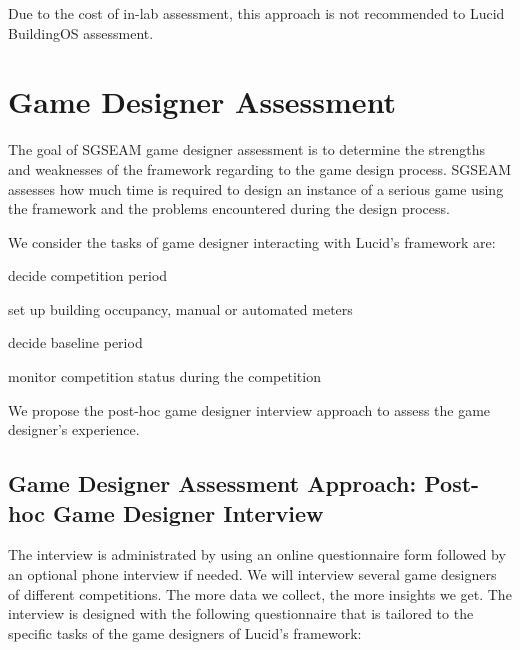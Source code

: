 \documentclass[11pt,oneside]{book}
\begin{document}
Due to the cost of in-lab assessment, this approach is not recommended to Lucid BuildingOS assessment.

\section{Game Designer Assessment}

The goal of SGSEAM game designer assessment is to determine the strengths and weaknesses of the framework 
regarding to the game design process. SGSEAM 
assesses how much time is required to design an instance of a serious game using the framework and the problems encountered during the design process.

We consider the tasks of game designer interacting with Lucid's framework are:
\begin{compactenum}
    \item decide competition period
    \item set up building occupancy, manual or automated meters
    \item decide baseline period
    \item monitor competition status during the competition
\end{compactenum}

We propose the post-hoc game designer interview approach to assess the game designer's experience.

\subsection{Game Designer Assessment Approach: Post-hoc Game Designer Interview}
\label{Post-hoc game designer interview}

 The interview is administrated by using an online questionnaire form followed by an optional phone interview if needed. We will interview several game designers of different competitions. The more data we collect, the more insights we get. The interview is designed with the following questionnaire that is tailored to the specific tasks of the game designers of Lucid's framework:
\end{document}
